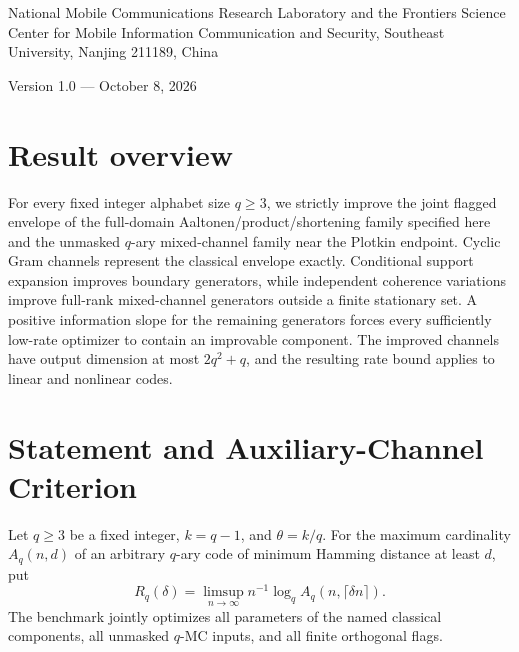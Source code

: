 \documentclass[12pt,letterpaper,onecolumn]{article}
\theoremstyle{definition}
\theoremstyle{remark}
\begin{document}
\par\medskip
{}\medskip
{}\par\smallskip
\noindent\begin{minipage}{\linewidth}\small National Mobile Communications Research Laboratory and the Frontiers Science Center for Mobile Information Communication and Security, Southeast University, Nanjing 211189, China\end{minipage}\par\medskip
\noindent Version 1.0 --- October 8, 2026\par\bigskip
{}
\section*{Result overview}
For every fixed integer alphabet size \(q\ge3\), we strictly improve the joint flagged envelope of the full-domain Aaltonen/product/shortening family specified here and the unmasked \(q\)-ary mixed-channel family near the Plotkin endpoint. Cyclic Gram channels represent the classical envelope exactly. Conditional support expansion improves boundary generators, while independent coherence variations improve full-rank mixed-channel generators outside a finite stationary set. A positive information slope for the remaining generators forces every sufficiently low-rate optimizer to contain an improvable component. The improved channels have output dimension at most \(2q^2+q\), and the resulting rate bound applies to linear and nonlinear codes.
\section{Statement and Auxiliary-Channel Criterion}
Let \(q\ge3\) be a fixed integer, \(k=q-1\), and \(\theta=k/q\). For the maximum cardinality \(A_q(n,d)\) of an arbitrary \(q\)-ary code of minimum Hamming distance at least \(d\), put
\[
R_q(\delta)=\limsup_{n\to\infty}n^{-1}\log_q A_q(n,\lceil\delta n\rceil).
\]
The benchmark jointly optimizes all parameters of the named classical components, all unmasked \(q\)-MC inputs, and all finite orthogonal flags.
\end{document}
